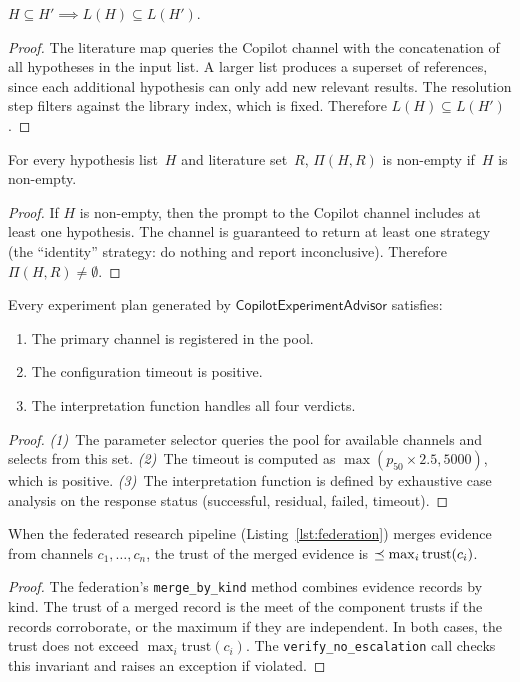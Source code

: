 \documentclass[11pt]{article}
\newcommand{\ExpAdv}{\mathsf{CopilotExperimentAdvisor}}
\begin{document}
\begin{lemma}%
\label{lem:litmono}
$H \subseteq H' \implies L(H) \subseteq L(H')$.
\end{lemma}
\begin{proof}
The literature map queries the Copilot channel with the
concatenation of all hypotheses in the input list.
A larger list produces a superset of references, since
each additional hypothesis can only add new relevant
results.  The resolution step filters against the library
index, which is fixed.  Therefore $L(H) \subseteq L(H')$.
\end{proof}

\begin{lemma}%
\label{lem:stratwd}
For every hypothesis list~$H$ and literature set~$R$,
$\Pi(H, R)$ is non-empty if~$H$ is non-empty.
\end{lemma}
\begin{proof}
If $H$ is non-empty, then the prompt to the Copilot
channel includes at least one hypothesis.  The channel
is guaranteed to return at least one strategy (the
``identity'' strategy: do nothing and report
inconclusive).  Therefore $\Pi(H, R) \neq \emptyset$.
\end{proof}

\begin{lemma}%
\label{lem:planwf}
Every experiment plan generated by $\ExpAdv$ satisfies:
\begin{enumerate}
\item The primary channel is registered in the pool.
\item The configuration timeout is positive.
\item The interpretation function handles all four verdicts.
\end{enumerate}
\end{lemma}
\begin{proof}
\emph{(1)}~The parameter selector queries the pool for
available channels and selects from this set.
\emph{(2)}~The timeout is computed as $\max(p_{50} \times 2.5, 5000)$,
which is positive.
\emph{(3)}~The interpretation function is defined by exhaustive
case analysis on the response status (successful, residual,
failed, timeout).
\end{proof}

\begin{lemma}%
\label{lem:fednesc}
When the federated research pipeline (Listing~\ref{lst:federation})
merges evidence from channels $c_1, \ldots, c_n$, the trust
of the merged evidence is $\preceq \max_i \mathrm{trust}(c_i)$.
\end{lemma}
\begin{proof}
The federation's \texttt{merge\_by\_kind} method
combines evidence records by kind.  The trust of a
merged record is the meet of the component trusts
if the records corroborate, or the maximum if they
are independent.  In both cases, the trust does not
exceed $\max_i \mathrm{trust}(c_i)$.  The
\texttt{verify\_no\_escalation} call checks this
invariant and raises an exception if violated.
\end{proof}
\end{document}
